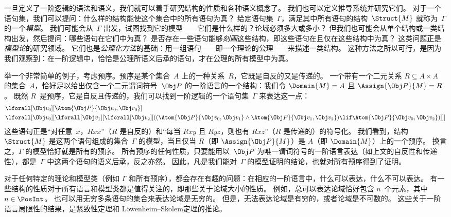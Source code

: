 \documentclass[../../../include/open-logic-section]{subfiles}
\begin{document}


一旦定义了一阶逻辑的语法和语义，我们就可以着手研究结构的性质和各种语义概念了。
我们也可以定义推导系统并研究它们。
对于一个语句集，我们可以提问：什么样的结构能使这个集合中的所有语句为真？
给定语句集~$\Gamma$，满足其中所有语句的结构~$\Struct{M}$ 就称为~$\Gamma$ 的一个\emph{模型}。
我们可能会从~$\Gamma$ 出发，试图找到它的模型——它们是什么样的？论域必须多大或多小？
但我们也可能会从单个结构或一类结构出发，然后提问：哪些语句在它们中为真？
是否存在一些语句能够\emph{刻画}这些结构，即这些语句在且仅在这些结构中为真？
这类问题正是\emph{模型论}的研究领域。
它们也是\emph{公理化方法}的基础：用一组语句——即一个理论的公理——来描述一类结构。
这种方法之所以可行，是因为我们观察到：在一阶逻辑中，恰恰是公理所语义后承的语句，才在公理的所有模型中为真。

举一个非常简单的例子，考虑预序。预序是某个集合~$A$ 上的一种关系~$R$，它既是自反的又是传递的。
一个带有一个二元关系 $R \subseteq A \times A$ 的集合~$A$，恰好足以给出仅含一个二元谓词符号~$\Obj P$ 的一阶语言的一个结构：我们令 $\Domain{M} = A$ 且 $\Assign{\Obj P}{M} = R$。
既然 $R$~是预序，它是自反且传递的，我们可以找到一阶逻辑的一个语句集~$\Gamma$ 来表达这一点：
\begin{align*}
  & \lforall[\Obj v_0][\Atom{\Obj P}{\Obj v_0,\Obj v_0}]\\
  & \lforall[\Obj v_0][\lforall[\Obj v_1][\lforall[\Obj v_2][((\Atom{\Obj P}{\Obj v_0,\Obj v_1} \land \Atom{\Obj P}{\Obj v_1,\Obj v_2}) \lif \Atom{\Obj P}{\Obj v_0,\Obj v_2})]]]
\end{align*}
这些语句正是“对任意~$x$，$Rxx$”（$R$ 是自反的）和“每当 $Rxy$ 且 $Ryz$，则也有 $Rxz$”（$R$ 是传递的）的符号化。
我们看到，结构~$\Struct{M}$ 是这两个语句组成的集合~$\Gamma$ 的模型，当且仅当 $R$（即 $\Assign{\Obj P}{M}$）是 $A$（即 $\Domain{M}$）上的一个预序。
换言之，$\Gamma$ 的模型恰好就是所有的预序。
所有预序的任何性质，只要能用以~$\Obj P$ 为唯一谓词符号的一阶语言表达（如上文的自反性和传递性），都是~$\Gamma$ 中这两个语句的语义后承，反之亦然。
因此，凡是我们能对~$\Gamma$ 的模型证明的结论，也就对所有预序得到了证明。

对于任何特定的理论和模型类（例如 $\Gamma$ 和所有预序），都会存在有趣的问题：在相应的一阶语言中，什么可以表达，什么不可以表达。
有一些结构的性质对于所有语言和模型类都是值得关注的，即那些关于论域大小的性质。
例如，总可以表达论域恰好包含 $n$~个元素，其中~$n \in \PosInt$。
也可以用无穷多条语句的集合来表达论域是无穷的。
但是，无法表达论域是有穷的，或者论域是不可数的。
这些关于一阶语言局限性的结果，是紧致性定理和 Löwenheim--Skolem定理的推论。
\end{document}
